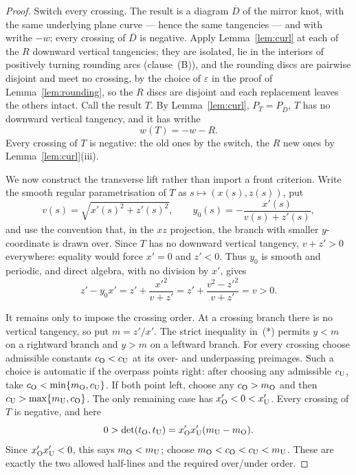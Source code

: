 \begin{proof}
Switch every crossing. The result is a diagram $\overline D$ of the mirror knot,
with the same underlying plane curve --- hence the same tangencies --- and with
writhe $-w$; every crossing of $\overline D$ is negative. Apply
Lemma~\ref{lem:curl} at each of the $R$ downward vertical tangencies; they are
isolated, lie in the interiors of positively turning rounding arcs
(clause~(B)), and the rounding discs are pairwise disjoint and
meet no crossing, by the choice of $\varepsilon$ in the proof of
Lemma~\ref{lem:rounding}, so the $R$ discs are
disjoint and each replacement leaves the others intact. Call the result $T$. By
Lemma~\ref{lem:curl}, $P_T=P_{\overline D}$, $T$ has no downward vertical
tangency, and it has writhe
\[
w(T)=-w-R .
\]
Every crossing of $T$ is negative: the old ones by the switch, the $R$ new ones by
Lemma~\ref{lem:curl}(iii).

We now construct the transverse lift rather than import a
front criterion.  Write the smooth regular parametrisation of $T$ as
$s\mapsto(x(s),z(s))$, put
\[
 v(s)=\sqrt{x'(s)^2+z'(s)^2},\qquad
 y_0(s)=-\frac{x'(s)}{v(s)+z'(s)},
\]
and use the convention that, in the $xz$ projection, the branch with smaller
$y$-coordinate is drawn over.  Since $T$ has no downward vertical tangency,
$v+z'>0$ everywhere: equality would force $x'=0$ and $z'<0$.  Thus $y_0$ is
smooth and periodic, and direct algebra, with no division by $x'$, gives
\[
 z'-y_0x'=z'+\frac{x'^2}{v+z'}
 =z'+\frac{v^2-z'^2}{v+z'}=v>0.                 \tag{*}
\]

It remains only to impose the crossing order.  At a crossing branch there is
no vertical tangency, so put $m=z'/x'$.  The strict inequality in~(*) permits
$y<m$ on a rightward branch and $y>m$ on a leftward branch.  For every crossing
choose admissible constants $c_{\rm O}<c_{\rm U}$ at its over- and underpassing
preimages.  Such a choice is automatic if the overpass points right: after
choosing any admissible $c_{\rm U}$, take
$c_{\rm O}<\min\{m_{\rm O},c_{\rm U}\}$.  If both point left, choose any
$c_{\rm O}>m_{\rm O}$ and then
$c_{\rm U}>\max\{m_{\rm U},c_{\rm O}\}$.  The only remaining case has
$x'_{\rm O}<0<x'_{\rm U}$.  Every crossing of $T$ is negative, and here
\[
 0>\det(t_{\rm O},t_{\rm U})
   =x'_{\rm O}x'_{\rm U}(m_{\rm U}-m_{\rm O}).
\]
Since $x'_{\rm O}x'_{\rm U}<0$, this says $m_{\rm O}<m_{\rm U}$; choose
$m_{\rm O}<c_{\rm O}<c_{\rm U}<m_{\rm U}$.  These are exactly the two allowed
half-lines and the required over/under order.


\end{proof}
